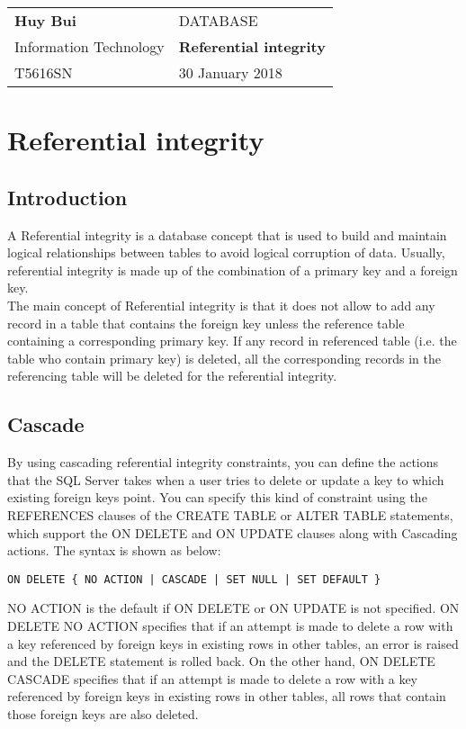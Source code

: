 \documentclass[10pt,a4paper]{article}
\author{Huy Bui}
\begin{document}
\begin{tabular}{p{8cm}l}
	\textbf{Huy Bui}		&	\textsc{DATABASE}			\\
	Information Technology	&	\textbf{Referential integrity}	\\
	T5616SN					&	30 January 2018				\\
\end{tabular}
\section{Referential integrity}
\subsection{Introduction}
A Referential integrity is a database concept that is used to build and maintain logical relationships between tables to avoid logical corruption of data. Usually, referential integrity is made up of the combination of a primary key and a foreign key. \\
The main concept of Referential integrity is that it does not allow to add any record in a table that contains the foreign key unless the reference table containing a corresponding primary key. If any record in referenced table (i.e. the table who contain primary key) is deleted, all the corresponding records in the referencing table will be deleted for the referential integrity. 
\subsection{Cascade} By using cascading referential integrity constraints, you can define the actions that the SQL Server takes when a user tries to delete or update a key to which existing foreign keys point. You can specify this kind of constraint using the REFERENCES clauses of the CREATE TABLE or ALTER TABLE statements, which support the ON DELETE and ON UPDATE clauses along with Cascading actions. The syntax is shown as below:
\begin{lstlisting}
ON DELETE { NO ACTION | CASCADE | SET NULL | SET DEFAULT } 
\end{lstlisting}
NO ACTION is the default if ON DELETE or ON UPDATE is not specified. ON DELETE NO ACTION specifies that if an attempt is made to delete a row with a key referenced by foreign keys in existing rows in other tables, an error is raised and the DELETE statement is rolled back. On the other hand, ON DELETE CASCADE specifies that if an attempt is made to delete a row with a key referenced by foreign keys in existing rows in other tables, all rows that contain those foreign keys are also deleted. 
\end{document}
